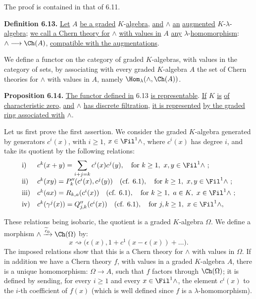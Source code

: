The proof is contained in that of 6.11.

\textbf{Definition 6.13.} \uline{Let} \(A\) \uline{be a graded} \(K\)-\uline{algebra}, \uline{and} \(\mathord{\wedge}\) \uline{an} \uline{augmented} \(K\)-\(\lambda\)-\uline{algebra}; \uline{we call a Chern theory for} \(\mathord{\wedge}\) \uline{with values in} \(A\) \uline{any} \(\lambda\)-\uline{homomorphism}: \(\mathord{\wedge}\longrightarrow \Ch(A)\), \uline{compatible with the augmentations}.

We define a functor on the category of graded \(K\)-algebras, with values in the category of sets, by associating with every graded \(K\)-algebra \(A\) the set of Chern theories for \(\mathord{\wedge}\) with values in \(A\), namely \(\Hom_\lambda(\mathord{\wedge},\Ch(A))\).

\textbf{Proposition 6.14.} \uline{The functor defined in} 6.13 \uline{is representable}. \uline{If} \(K\) \uline{is} \uline{of characteristic zero}, \uline{and} \(\mathord{\wedge}\) \uline{has discrete filtration}, \uline{it is represented} \uline{by the graded ring associated with} \(\mathord{\wedge}\).

Let us first prove the first assertion. We consider the graded \(K\)-algebra generated by generators \(c^i(x)\), with \(i\ge1\), \(x\in\Fil^1\mathord{\wedge}\), where \(c^i(x)\) has degree \(i\), and take its quotient by the following relations:
\[
\begin{array}{ll}
\text{i)}&
 c^k(x+y)=\displaystyle\sum_{i+j=k}c^i(x)c^j(y),
 \quad\text{for } k\ge1,\ x,y\in\Fil^1\mathord{\wedge}\ ;\\[0.8em]
\text{ii)}&
 c^k(xy)=P''_k(c^i(x),c^j(y))
 \quad(\text{cf. }6.1),
 \quad\text{for } k\ge1,\ x,y\in\Fil^1\mathord{\wedge}\ ;\\[0.4em]
\text{iii)}&
 c^k(ax)=R_{k,a}(c^i(x)) \quad(\text{cf. }6.1),
 \quad\text{for } k\ge1,\ a\in K,\ x\in\Fil^1\mathord{\wedge}\ ;\\[0.4em]
\text{iv)}&
 c^k(\gamma^j(x))=Q''_{j,k}(c^i(x))
 \quad(\text{cf. }6.1),
 \quad\text{for } j,k\ge1,\ x\in\Fil^1\mathord{\wedge},
\end{array}
\]

%
These relations being isobaric, the quotient is a graded \(K\)-algebra \(\Omega\). We define a morphism \(\mathord{\wedge}\xrightarrow{\widetilde c_0}\Ch(\Omega)\) by:
\[
  x\rightsquigarrow
  \bigl(\epsilon(x),1+c^1(x-\epsilon(x))+\ldots\bigr).
\]
The imposed relations show that this is a Chern theory for \(\mathord{\wedge}\) with values in \(\Omega\). If in addition we have a Chern theory \(f\), with values in a graded \(K\)-algebra \(A\), there is a unique homomorphism: \(\Omega\to A\), such that \(f\) factors through \(\Ch(\Omega)\); it is defined by sending, for every \(i\ge1\) and every \(x\in\Fil^1\mathord{\wedge}\), the element \(c^i(x)\) to the \(i\)-th coefficient of \(f(x)\) (which is well defined since \(f\) is a \(\lambda\)-homomorphism).

